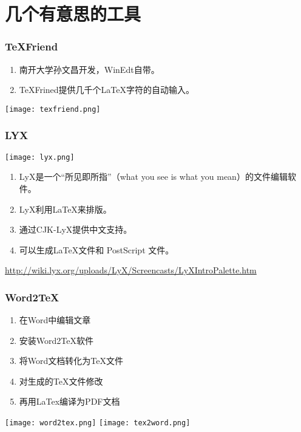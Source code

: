 \section{几个有意思的工具}
\begin{frame}
  \frametitle{TeXFriend}
  \begin{enumerate}
    \item<2-> 南开大学孙文昌开发，WinEdt自带。
    \item<3-> TeXFrined提供几千个LaTeX字符的自动输入。
  \end{enumerate}
  \begin{center}
    \texttt{[image: texfriend.png]}
  \end{center}
\end{frame}

\begin{frame}
  \frametitle{LYX}
  \begin{center}
    \texttt{[image: lyx.png]}
  \end{center}
  \begin{enumerate}
    \item<2-> LyX是一个“所见即所指”（what you see is what you mean）的文件编辑软件。
    \item<3-> LyX利用\LaTeX{}来排版。
    \item<4-> 通过CJK-LyX提供中文支持。
    \item<5-> 可以生成\LaTeX{}文件和 PostScript 文件。
  \end{enumerate}
\begin{center}
    \footnotesize{\url{http://wiki.lyx.org/uploads/LyX/Screencasts/LyXIntroPalette.htm}}
\end{center}
\end{frame}

\begin{frame}
  \frametitle{Word2TeX}
  \begin{enumerate}
    \item<2-> 在Word中编辑文章
    \item<3-> 安装Word2TeX软件
    \item<4-> 将Word文档转化为TeX文件
    \item<5-> 对生成的TeX文件修改
    \item<6-> 再用LaTex编译为PDF文档
  \end{enumerate}
  \begin{center}
    \texttt{[image: word2tex.png]} \qquad
    \texttt{[image: tex2word.png]}
  \end{center}
\end{frame}